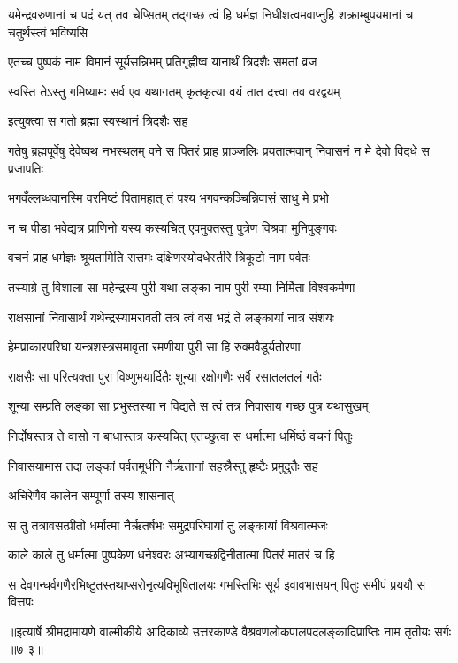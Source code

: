 \threelineshloka
{यमेन्द्रवरुणानां च पदं यत् तव चेप्सितम्}
{तद्गच्छ त्वं हि धर्मज्ञ निधीशत्वमवाप्नुहि}
{शक्राम्बुपयमानां च चतुर्थस्त्वं भविष्यसि} %

\twolineshloka
{एतच्च पुष्पकं नाम विमानं सूर्यसन्निभम्}
{प्रतिगृह्णीष्व यानार्थं त्रिदशैः समतां व्रज} %

\twolineshloka
{स्वस्ति तेऽस्तु गमिष्यामः सर्व एव यथागतम्}
{कृतकृत्या वयं तात दत्त्वा तव वरद्वयम्} %

\onelineshloka
{इत्युक्त्वा स गतो ब्रह्मा स्वस्थानं त्रिदशैः सह} %

\threelineshloka
{गतेषु ब्रह्मपूर्वेषु देवेष्वथ नभस्थलम्}
{वने स पितरं प्राह प्राञ्जलिः प्रयतात्मवान्}
{निवासनं न मे देवो विदधे स प्रजापतिः} %

\twolineshloka
{भगवँल्लब्धवानस्मि वरमिष्टं पितामहात्}
{तं पश्य भगवन्कञ्चिन्निवासं साधु मे प्रभो} %

\twolineshloka
{न च पीडा भवेद्यत्र प्राणिनो यस्य कस्यचित्}
{एवमुक्तस्तु पुत्रेण विश्रवा मुनिपुङ्गवः} %

\twolineshloka
{वचनं प्राह धर्मज्ञः श्रूयतामिति सत्तमः}
{दक्षिणस्योदधेस्तीरे त्रिकूटो नाम पर्वतः} %

\twolineshloka
{तस्याग्रे तु विशाला सा महेन्द्रस्य पुरी यथा}
{लङ्का नाम पुरी रम्या निर्मिता विश्वकर्मणा} %

\twolineshloka
{राक्षसानां निवासार्थं यथेन्द्रस्यामरावती}
{तत्र त्वं वस भद्रं ते लङ्कायां नात्र संशयः} %

\twolineshloka
{हेमप्राकारपरिघा यन्त्रशस्त्रसमावृता}
{रमणीया पुरी सा हि रुक्मवैडूर्यतोरणा} %

\twolineshloka
{राक्षसैः सा परित्यक्ता पुरा विष्णुभयार्दितैः}
{शून्या रक्षोगणैः सर्वै रसातलतलं गतैः} %

\twolineshloka
{शून्या सम्प्रति लङ्का सा प्रभुस्तस्या न विद्यते}
{स त्वं तत्र निवासाय गच्छ पुत्र यथासुखम्} %

\twolineshloka
{निर्दोषस्तत्र ते वासो न बाधास्तत्र कस्यचित्}
{एतच्छुत्वा स धर्मात्मा धर्मिष्ठं वचनं पितुः} %

\twolineshloka
{निवासयामास तदा लङ्कां पर्वतमूर्धनि}
{नैर्ऋतानां सहस्रैस्तु हृष्टैः प्रमुदुतैः सह} %

\onelineshloka
{अचिरेणैव कालेन सम्पूर्णा तस्य शासनात्} %

\twolineshloka
{स तु तत्रावसत्प्रीतो धर्मात्मा नैर्ऋतर्षभः}
{समुद्रपरिघायां तु लङ्कायां विश्रवात्मजः} %

\twolineshloka
{काले काले तु धर्मात्मा पुष्पकेण धनेश्वरः}
{अभ्यागच्छद्विनीतात्मा पितरं मातरं च हि} %

\twolineshloka
{स देवगन्धर्वगणैरभिष्टुतस्तथाप्सरोनृत्यविभूषितालयः}
{गभस्तिभिः सूर्य इवावभासयन् पितुः समीपं प्रययौ स वित्तपः} %


॥इत्यार्षे श्रीमद्रामायणे वाल्मीकीये आदिकाव्ये उत्तरकाण्डे वैश्रवणलोकपालपदलङ्कादिप्राप्तिः नाम तृतीयः सर्गः ॥७-३॥

